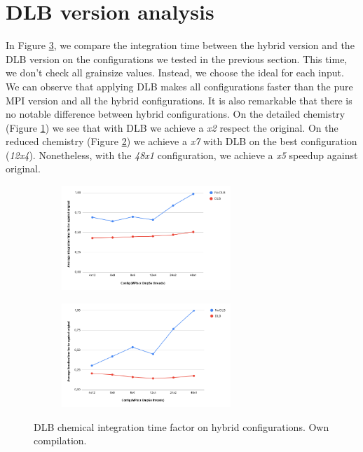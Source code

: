 \section{DLB version analysis}

In Figure \ref{fig:plot-hybrid-dlb-int}, we compare the integration time between the hybrid version and the DLB version on the configurations we tested in the previous section. This time, we don't check all grainsize values. Instead, we choose the ideal for each input. We can observe that applying DLB makes all configurations faster than the pure MPI version and all the hybrid configurations. It is also remarkable that there is no notable difference between hybrid configurations. On the detailed chemistry (Figure \ref{fig:plot-hybrid-dlb-int-det}) we see that with DLB we achieve a \textit{x2} respect the original. On the reduced chemistry (Figure \ref{fig:plot-hybrid-dlb-int-red}) we achieve a \textit{x7} with DLB on the best configuration (\textit{12x4}). Nonetheless, with the \textit{48x1} configuration, we achieve a \textit{x5} speedup against original.
\begin{figure}[ht]
  \begin{subfigure}{1\textwidth}
    \centering
    \includegraphics[width=0.7\textwidth]{graphics/hybridcompletedlb.png}
    \label{fig:plot-hybrid-dlb-int-det}

  \end{subfigure}
  \begin{subfigure}{1\textwidth}
    \centering
    \includegraphics[width=0.7\textwidth]{graphics/hybridreduceddlb.png}
    \label{fig:plot-hybrid-dlb-int-red}

  \end{subfigure}

  \caption[DLB chemical integration time factor on hybrid configurations.]{DLB chemical integration time factor on hybrid configurations. Own compilation.}
  \label{fig:plot-hybrid-dlb-int}
\end{figure}

